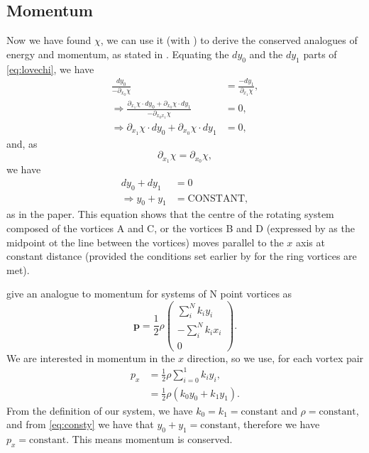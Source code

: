 \documentclass[10pt, a4paper]{article}
\numberwithin{equation}{section}
\newcommand{\half}{\frac{1}{2}}
\newcommand{\dxa}{\partial_{x_0}}
\newcommand{\dxb}{\partial_{x_1}}
\begin{document}
\subsection{Momentum}
Now we have found $\chi$, we can use it (with ) to derive the conserved analogues of energy and momentum, as stated in \citet{love94}.
Equating the $dy_0$ and the $dy_1$ parts of \cref{eq:lovechi}, we have
\begin{align}
\frac{dy_0}{-\partial_{x_0}\chi} &= \frac{-dy_1}{\partial_{x_1} \chi},\\
\Rightarrow \frac{\dxb \chi\cdot dy_0 + \dxa \chi \cdot dy_1}{-\partial_{x_0 x_1} \chi}&=0,\\
\Rightarrow \dxb \chi\cdot dy_0 + \dxa \chi \cdot dy_1 &=0,
\end{align}
and, as
\begin{equation}
\dxb \chi = \dxa \chi,
\end{equation}
we have
\begin{align}
dy_0 + dy_1 &=0\\
\Rightarrow y_0 + y_1 &= \mbox{CONSTANT}\label{eq:consty},
\end{align}
as in the paper.
This equation shows that the centre of the rotating system composed of the vortices A and C, or the vortices B and D (expressed by \citeauthor{love94} as the midpoint ot the line between the vortices) moves parallel to the $x$ axis at constant distance (provided the conditions set earlier by \citeauthor{helmholtz67} for the ring vortices are met).

\citet{musgrave09} give an analogue to momentum for systems of N point vortices as
\begin{equation}
\bm{p}=\half \rho \left(\begin{array}{c} \sum_i^N k_i y_i\\-\sum_{i}^N k_i x_i\\0\end{array}\right).
\end{equation}
We are interested in momentum in the $x$ direction, so we use, for each vortex pair
\begin{align}
p_x&=\half \rho \sum_{i=0}^1 k_i y_i,\\
&= \half \rho (k_0 y_0 + k_1 y_1).
\end{align}
From the definition of our system, we have $k_0=k_1=\mbox{constant}$ and $\rho=\mbox{constant}$, and from \cref{eq:consty} we have that $y_0 + y_1 = \mbox{constant}$, therefore we have $p_x=\mbox{constant}$.
This means momentum is conserved.
\end{document}
